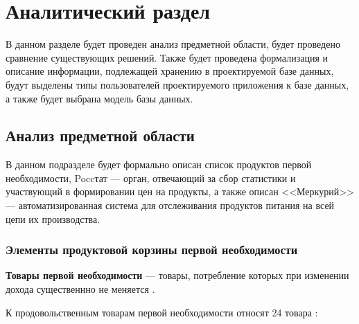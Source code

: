 \chapter{Аналитический раздел}

В данном разделе будет проведен анализ предметной области, будет проведено сравнение существующих решений. 
Также будет проведена формализация и описание информации, подлежащей хранению в проектируемой базе данных, будут выделены типы пользователей проектируемого приложения к базе данных, а также будет выбрана модель базы данных.

\section{Анализ предметной области}

В данном подразделе будет формально описан список продуктов первой необходимости, Poccтат --- орган, отвечающий за сбор статистики и участвующий в формировании цен на продукты, а также описан <<Меркурий>> --- автоматизированная система для отслеживания продуктов питания на всей цепи их производства.

\subsection{Элементы продуктовой корзины первой необходимости}

\textbf{Товары первой необходимости} --- товары, потребление которых при изменении дохода существеннно не меняется \cite{info_essential_goods}.

К продовольственным товарам первой необходимости относят 24 товара \cite{info_essential_goods2}:

